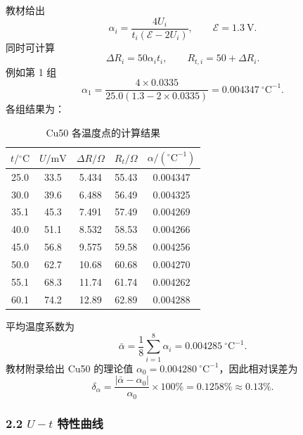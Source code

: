 教材给出
\begin{equation}
  \alpha_i=\frac{4U_i}{t_i(\mathcal E-2U_i)},
  \qquad \mathcal E=1.3\ \mathrm V.
\end{equation}
同时可计算
\begin{equation}
  \Delta R_i=50\alpha_it_i,
  \qquad R_{t,i}=50+\Delta R_i.
\end{equation}
例如第 1 组
\begin{equation}
  \alpha_1
  =\frac{4\times0.0335}{25.0(1.3-2\times0.0335)}
  =0.004347\ {}^\circ\mathrm C^{-1}.
\end{equation}
各组结果为：

\begin{table}[H]
  \centering
  \footnotesize
  \caption{Cu50 各温度点的计算结果}
  \begin{tabular}{ccccc}
    \toprule
    $t/{}^\circ\mathrm C$ & $U/\mathrm{mV}$ & $\Delta R/\Omega$ & $R_t/\Omega$ & $\alpha/({}^\circ\mathrm C^{-1})$ \\
    \midrule
    25.0 & 33.5 & 5.434 & 55.43 & 0.004347 \\
    30.0 & 39.6 & 6.488 & 56.49 & 0.004325 \\
    35.1 & 45.3 & 7.491 & 57.49 & 0.004269 \\
    40.0 & 51.1 & 8.532 & 58.53 & 0.004266 \\
    45.0 & 56.8 & 9.575 & 59.58 & 0.004256 \\
    50.0 & 62.7 & 10.68 & 60.68 & 0.004270 \\
    55.1 & 68.3 & 11.74 & 61.74 & 0.004262 \\
    60.1 & 74.2 & 12.89 & 62.89 & 0.004288 \\
    \bottomrule
  \end{tabular}
\end{table}

平均温度系数为
\begin{equation}
  \bar\alpha=\frac{1}{8}\sum_{i=1}^{8}\alpha_i
  =0.004285\ {}^\circ\mathrm C^{-1}.
\end{equation}
教材附录给出 Cu50 的理论值 $\alpha_0=0.004280\ {}^\circ\mathrm C^{-1}$，因此相对误差为
\begin{equation}
  \delta_\alpha
  =\frac{|\bar\alpha-\alpha_0|}{\alpha_0}\times100\%
  =0.1258\%\approx0.13\%.
\end{equation}

\subsubsection*{2.2 $U-t$ 特性曲线}

